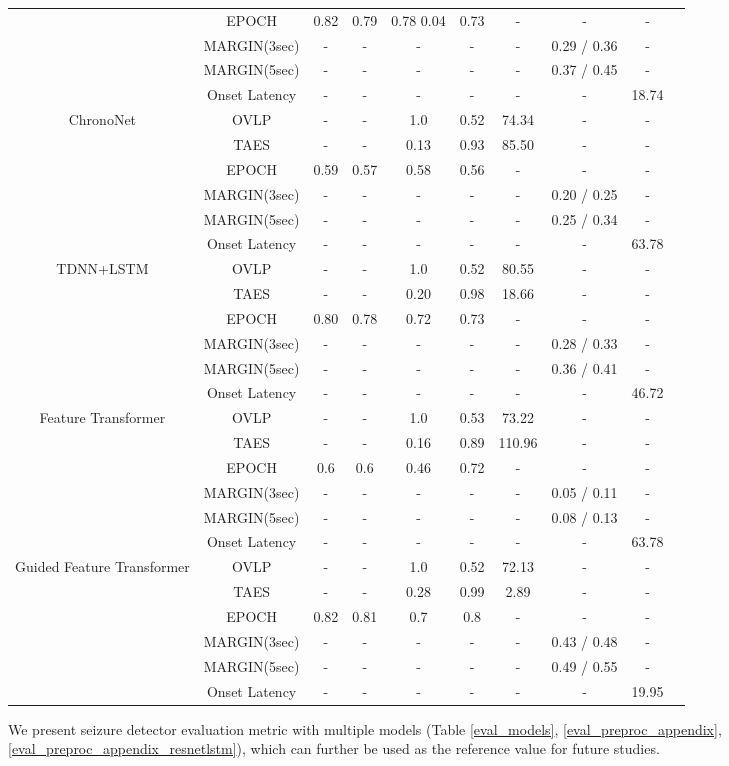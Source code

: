 \documentclass[pmlr,twocolumn,10pt]{jmlr}
\begin{document}
\begin{table*}[ht!]
\begin{tabular}{c|c|cccccccc}
		& EPOCH & 0.82& 0.79 & 0.78 0.04 & 0.73 & - & - & -  \\
		& MARGIN(3sec)  & - & - & - & - & - & 0.29 / 0.36 & - \\
		& MARGIN(5sec) & - & - & - & - & - & 0.37 / 0.45 & - \\
		& Onset Latency & - & - & - & - & - & - & 18.74 \\
		\midrule
		\multirow{6}{*}{ChronoNet} 
		& OVLP & - & - & 1.0 & 0.52 & 74.34 & - & - \\
		& TAES & - & - & 0.13 & 0.93 & 85.50  & - & - \\
		& EPOCH & 0.59 & 0.57 & 0.58 & 0.56 & - & - & -  \\
		& MARGIN(3sec)  & - & - & - & - & - & 0.20 / 0.25& -  \\
		& MARGIN(5sec) & - & - & - & - & - & 0.25 / 0.34 & -  \\
		& Onset Latency & - & - & - & - & - & - & 63.78 \\
		\midrule
		\multirow{6}{*}{TDNN+LSTM} 
		& OVLP & - & - & 1.0 & 0.52 & 80.55 & - & - \\
		& TAES & - & - & 0.20 & 0.98 & 18.66 & - & - \\
		& EPOCH & 0.80  & 0.78 & 0.72 & 0.73 & - & - & -  \\
		& MARGIN(3sec)  & - & - & - & - & - & 0.28 / 0.33  & -  \\
		& MARGIN(5sec) & - & - & - & - & - & 0.36 / 0.41 & -   \\
		& Onset Latency & - & - & - & - & - & - & 46.72 \\
		\midrule
		\multirow{6}{*}{Feature Transformer} 
		& OVLP & - & - & 1.0 & 0.53 & 73.22 & - & - \\
		& TAES & - & - & 0.16 & 0.89 & 110.96 & - & - \\
		& EPOCH & 0.6 & 0.6 & 0.46 & 0.72 & - & - & -  \\
		& MARGIN(3sec)  & - & - & - & - & - & 0.05 / 0.11 & - \\
		& MARGIN(5sec) & - & - & - & - & - & 0.08 / 0.13 & - \\
		& Onset Latency & - & - & - & - & - & - & 63.78 \\
		\midrule
		\multirow{6}{*}{Guided Feature Transformer} 
		& OVLP & - & - & 1.0 & 0.52 & 72.13 & - & - \\
		& TAES & - & - & 0.28 & 0.99 & 2.89 & - & - \\
		& EPOCH & 0.82 & 0.81 & 0.7 & 0.8 & - & - & -  \\
		& MARGIN(3sec)  & - & - & - & - & - & 0.43 / 0.48 & - \\
		& MARGIN(5sec) & - & - & - & - & - & 0.49 / 0.55 & -  \\
		& Onset Latency & - & - & - & - & - & - & 19.95 \\
		\bottomrule
	\end{tabular}
\end{table*} We present seizure detector evaluation metric with multiple models (Table \ref{eval_models}, \ref{eval_preproc_appendix}, \ref{eval_preproc_appendix_resnetlstm}), which can further be used as the reference value for future studies.
\end{document}
